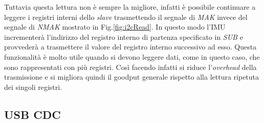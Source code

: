 Tuttavia questa lettura non è sempre la migliore, infatti è possibile continuare a leggere i registri interni dello \textit{slave} trasmettendo il segnale di \textit{MAK} invece del segnale di \textit{NMAK} mostrato in Fig.\ref{fig:i2cRead}. In questo modo l'IMU incrementerà l'indirizzo del registro interno di partenza specificato in \textit{SUB} e provvederà a trasmettere il valore del registro interno successivo ad esso. Questa funzionalità è molto utile quando si devono leggere dati, come in questo caso, che sono rappresentati con più registri. Così facendo infatti si riduce l'\textit{overhead} della trasmissione e si migliora quindi il goodput generale rispetto alla lettura ripetuta dei singoli registri.
 
	
\subsection{USB CDC}
\label{imp_usbcdc}